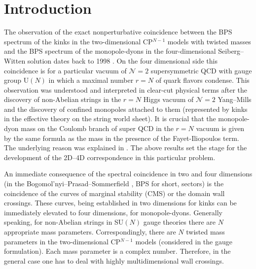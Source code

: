 \documentclass[epsfig,12pt]{article}
\begin{document}
\newpage

\section{Introduction}
\setcounter{equation}{0}

	The observation of the exact nonperturbative coincidence between the BPS spectrum
	of the kinks in the two-dimensional CP$^{N-1}$ models with twisted masses and the BPS spectrum of the monopole-dyons
	in the four-dimensional Seiberg--Witten solution 
\cite{SeibergWitten}
	dates back to 1998 
\cite{Dorey:1998yh}. On the four dimensional side this coincidence is for a particular vacuum of ${\mathcal N}=2$
supersymmetric QCD with gauge group U$(N)$ in which a maximal number $r=N$ of quark flavors condense.
	This observation was understood and interpreted in clear-cut physical terms after the discovery of non-Abelian strings 
	\cite{1,2} in the $r=N$ Higgs vacuum of ${\mathcal N}=2$ Yang--Mills and the discovery of confined monopoles attached to them 
\cite{Shifman:2004dr,4} 
	(represented by kinks in the effective theory on the string world sheet). 
	It is crucial that the monopole-dyon mass  on the Coulomb branch of super QCD in the $r=N$ vacuum is given by the same formula  
	as the mass in the presence of  the  Fayet-Iliopoulos term.
	The underlying reason was explained in 
\cite{Shifman:2004dr,4}. 
	The above results  set the stage for the development of the 2D--4D correspondence in this particular problem.

	An immediate consequence of the spectral coincidence in two and four dimensions 
	(in the Bogomol'nyi--Prasad--Sommerfield 
\cite{BPS}, 
	BPS for short, sectors) 
	is the coincidence of the curves of marginal stability (CMS) or the domain wall crossings.
	These curves, being established in two dimensions for kinks can be immediately elevated to four dimensions, for monopole-dyons. 
	Generally speaking, for non-Abelian strings in SU$(N)$ gauge theories there are $N$ appropriate mass parameters.
	Correspondingly, there are $N$ twisted mass parameters in the two-dimensional CP$^{N-1}$ models (considered in the gauge formulation). 
	Each mass parameter is a complex number. 
	Therefore, in the general case one has to deal with highly multidimensional 
	 wall crossings.
\end{document}
